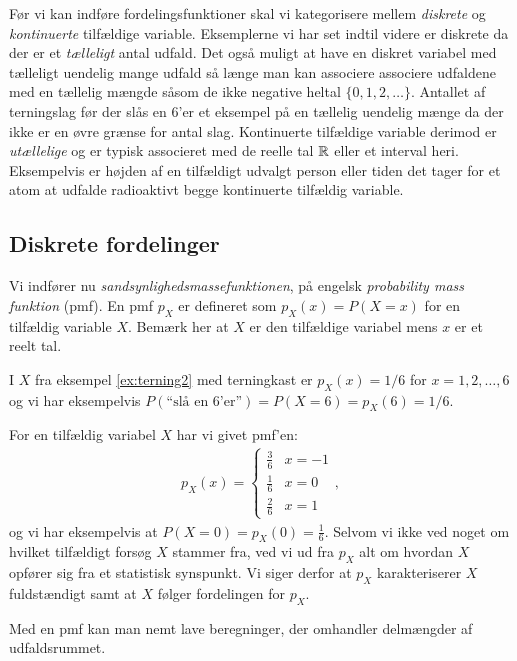 Før vi kan indføre fordelingsfunktioner skal vi kategorisere mellem \emph{diskrete} og \emph{kontinuerte} tilfældige variable. Eksemplerne vi har set indtil videre er diskrete da der er et \emph{tælleligt} antal udfald. Det også muligt at have en diskret variabel med tælleligt uendelig mange udfald så længe man kan associere associere udfaldene med en tællelig mængde såsom de ikke negative heltal $\{0,1,2,\dots\}$. Antallet af terningslag før der slås en 6'er et eksempel på en tællelig uendelig mænge da der ikke er en øvre grænse for antal slag. Kontinuerte tilfældige variable derimod er \textit{utællelige} og er typisk associeret med de reelle tal $\mathbb{R}$ eller et interval heri. Eksempelvis er højden af en tilfældigt udvalgt person eller tiden det tager for et atom at udfalde radioaktivt begge kontinuerte tilfældig variable. 
\subsection{Diskrete fordelinger}
Vi indfører nu \emph{sandsynlighedsmassefunktionen}, på engelsk \textit{probability mass funktion} (pmf). En pmf $p_X$ er defineret som $p_X(x) = P(X = x)$ for en tilfældig variable $X$. Bemærk her at $X$ er den tilfældige variabel mens $x$ er et reelt tal.
\begin{example} \label{ex:terning3} I $X$ fra eksempel \ref{ex:terning2} med terningkast er $p_X(x) = 1/6$ for $x = 1,2,\dots, 6$ og vi har eksempelvis $P(\text{``slå en 6'er''}) = P(X = 6) = p_X(6) = 1/6$. 
\end{example}
\begin{example} \label{ex:terning4} For en tilfældig variabel $X$ har vi givet pmf'en:
\begin{align*}
p_X(x) = \begin{cases}
\frac{3}{6} & x = -1 \\
\frac{1}{6} & x = 0 \\ 
\frac{2}{6} & x = 1
\end{cases},
\end{align*}
og vi har eksempelvis at $P(X = 0) = p_X(0) = \frac{1}{6}$. Selvom vi ikke ved noget om hvilket tilfældigt forsøg $X$ stammer fra, ved vi ud fra $p_X$ alt om hvordan $X$ opfører sig fra et statistisk synspunkt. Vi siger derfor at $p_X$ karakteriserer $X$ fuldstændigt samt at $X$ følger fordelingen for $p_X$. 
\end{example}
Med en pmf kan man nemt lave beregninger, der omhandler delmængder af udfaldsrummet. 
